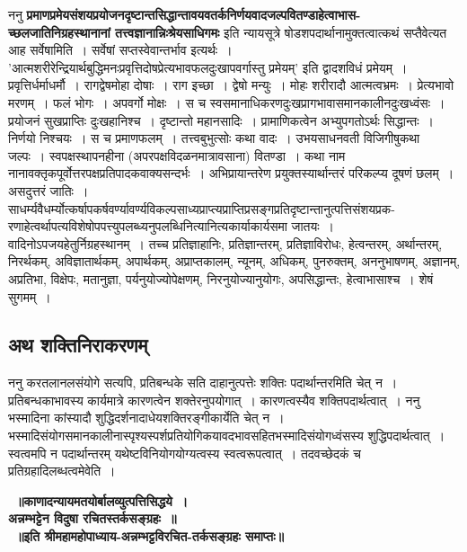 	ननु {\bfseries प्रमाणप्रमेयसंशयप्रयोजनदृष्टान्तसिद्धान्तावयवतर्कनिर्णयवादजल्पवितण्डाहेत्वाभास\-- च्छलजातिनिग्रहस्थानानां तत्त्वज्ञानान्निःश्रेयसाधिगमः} इति न्यायसूत्रे षोडशपदार्थानामुक्तत्वात्कथं सप्तैवेत्यत आह सर्वेषामिति~। सर्वेषां सप्तस्वेवान्तर्भाव इत्यर्थः~। ’आत्मशरीरेन्द्रियार्थबुद्धिमनःप्रवृत्तिदोषप्रेत्यभावफलदुःखापवर्गास्तु प्रमेयम्’ इति द्वादशविधं प्रमेयम्~। प्रवृत्तिर्धर्माधर्मौ~। रागद्वेषमोहा दोषाः~। राग इच्छा~। द्वेषो मन्युः~। मोहः शरीरादौ आत्मत्वभ्रमः~। प्रेत्यभावो मरणम्~। फलं भोगः~। अपवर्गो मोक्षः~। स च स्वसमानाधिकरणदुःखप्रागभावासमानकालीनदुःखध्वंसः~। प्रयोजनं सुखप्राप्तिः दुःखहानिश्च~। दृष्टान्तो महानसादिः~। प्रामाणिकत्वेन अभ्युपगतोऽर्थः सिद्धान्तः~। निर्णयो निश्चयः~। स च प्रमाणफलम्~। तत्त्वबुभुत्सोः कथा वादः~। उभयसाधनवती विजिगीषुकथा जल्पः~। स्वपक्षस्थापनहीना (अपरपक्षविदळनमात्रावसाना) वितण्डा~। कथा नाम नानावक्तृकपूर्वोत्तरपक्षप्रतिपादकवाक्यसन्दर्भः~। अभिप्रायान्तरेण प्रयुक्तस्यार्थान्तरं परिकल्प्य दूषणं छलम्~। असदुत्तरं जातिः~। साधर्म्यवैधर्म्योत्कर्षापकर्षवर्ण्यावर्ण्यविकल्पसाध्यप्राप्त्यप्राप्तिप्रसङ्गप्रतिदृष्टान्तानुत्पत्तिसंशयप्रक\-- रणाहेत्वर्थापत्यविशेषोपपत्त्युपलब्ध्यनुपलब्धिनित्यानित्यकार्याकार्यसमा जातयः~। वादिनोऽपजयहेतुर्निग्रहस्थानम्~। तच्च प्रतिज्ञाहानिः, प्रतिज्ञान्तरम्, प्रतिज्ञाविरोधः, हेत्वन्तरम्, अर्थान्तरम्, निरर्थकम्, अविज्ञातार्थकम्, अपार्थकम्, अप्राप्तकालम्, न्यूनम्, अधिकम्, पुनरुक्तम्, अननुभाषणम्, अज्ञानम्, अप्रतिभा, विक्षेपः, मतानुज्ञा, पर्यनुयोज्योपेक्षणम्, निरनुयोज्यानुयोगः, अपसिद्धान्तः, हेत्वाभासाश्च~। शेषं सुगमम्~।
\subsection*{अथ शक्तिनिराकरणम्}

	ननु करतलानलसंयोगे सत्यपि, प्रतिबन्धके सति दाहानुत्पत्तेः शक्तिः पदार्थान्तरमिति चेत् न~। प्रतिबन्धकाभावस्य कार्यमात्रे कारणत्वेन शक्तेरनुपयोगात्~। कारणत्वस्यैव शक्तिपदार्थत्वात्~। ननु भस्मादिना कांस्यादौ शुद्धिदर्शनादाधेयशक्तिरङ्गीकार्येति चेत् न~। भस्मादिसंयोगसमानकालीनास्पृश्यस्पर्शप्रतियोगिकयावदभावसहितभस्मादिसंयोगध्वंसस्य शुद्धिपदार्थत्वात्~। स्वत्वमपि न पदार्थान्तरम् यथेष्टविनियोगयोग्यत्वस्य स्वत्वरूपत्वात्~। तदवच्छेदकं च प्रतिग्रहादिलब्धत्वमेवेति~। \begin{center} {\bfseries~॥काणादन्यायमतयोर्बालव्युत्पत्तिसिद्धये~।\\
 अन्नम्भट्टेन विदुषा रचितस्तर्कसङ्ग्रहः~॥\\[10pt]
~॥इति श्रीमहामहोपाध्याय-अन्नम्भट्टविरचित-तर्कसङ्ग्रहः समाप्तः॥}
\end{center}
